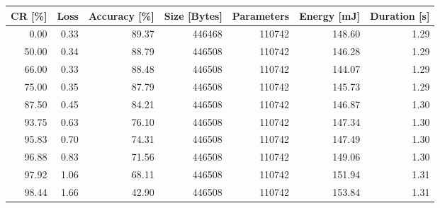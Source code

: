 \begin{tabular}{rrrrrrr}
\toprule
    CR [\%] &       Loss & Accuracy [\%] & Size [Bytes] & Parameters & Energy [mJ] & Duration [s] \\
\midrule
      0.00 &       0.33 &        89.37 &       446468 &     110742 &      148.60 &         1.29 \\
     50.00 &       0.34 &        88.79 &       446508 &     110742 &      146.28 &         1.29 \\
     66.00 &       0.33 &        88.48 &       446508 &     110742 &      144.07 &         1.29 \\
     75.00 &       0.35 &        87.79 &       446508 &     110742 &      145.73 &         1.29 \\
     87.50 &       0.45 &        84.21 &       446508 &     110742 &      146.87 &         1.30 \\
     93.75 &       0.63 &        76.10 &       446508 &     110742 &      147.34 &         1.30 \\
     95.83 &       0.70 &        74.31 &       446508 &     110742 &      147.49 &         1.30 \\
     96.88 &       0.83 &        71.56 &       446508 &     110742 &      149.06 &         1.30 \\
     97.92 &       1.06 &        68.11 &       446508 &     110742 &      151.94 &         1.31 \\
     98.44 &       1.66 &        42.90 &       446508 &     110742 &      153.84 &         1.31 \\
\bottomrule
\end{tabular}
